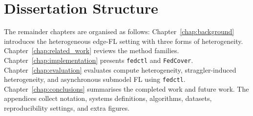 \section{Dissertation Structure}
The remainder chapters are organised as follows: Chapter~\ref{chap:background} introduces the heterogeneous edge-FL setting with three forms of heterogeneity. Chapter~\ref{chap:related_work} reviews the method families. Chapter~\ref{chap:implementation} presents \texttt{fedctl} and \texttt{FedCover}. Chapter~\ref{chap:evaluation} evaluates compute heterogeneity, straggler-induced heterogeneity, and asynchronous submodel FL using \texttt{fedctl}. Chapter~\ref{chap:conclusions} summarises the completed work and future work. The appendices collect notation, systems definitions, algorithms, datasets, reproducibility settings, and extra figures.
